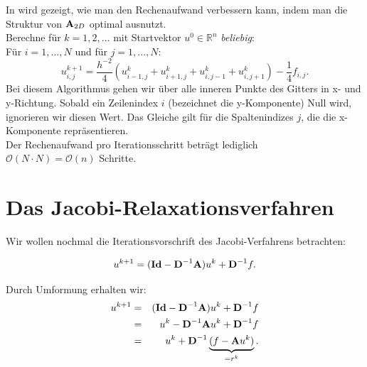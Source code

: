 In \cite[S. 21]{ALO02} wird gezeigt, wie man den Rechenaufwand verbessern kann, indem man die Struktur von ${\textbf{A}}_{2D}$ optimal ausnutzt.\\
Berechne für $k = 1,2,...$ mit Startvektor $u^{0} \in \mathbb{R}^{n}$ \textit{beliebig}:\\
Für $i = 1,...,N$ und für $j = 1,...,N$:
\begin{equation}
u^{k+1}_{i,j} = \frac{h^{-2}}{4} (u^{k}_{i-1,j} + u^{k}_{i+1,j} + u^{k}_{i,j-1} + u^{k}_{i,j+1}) - \frac{1}{4} f_{i,j}.
\end{equation}
Bei diesem Algorithmus gehen wir über alle inneren Punkte des Gitters in x- und y-Richtung. Sobald ein Zeilenindex $i$ (bezeichnet die y-Komponente) Null wird, ignorieren wir diesen Wert. Das Gleiche gilt für die Spaltenindizes $j$, die die x-Komponente repräsentieren.\\
Der Rechenaufwand pro Iterationsschritt beträgt lediglich \\$\mathcal{O}(N \cdot N)=\mathcal{O}(n)$ Schritte.

\section{Das Jacobi-Relaxationsverfahren}\label{s.Jacobi Relaxation}

Wir wollen nochmal die Iterationsvorschrift des Jacobi-Verfahrens betrachten:

\begin{equation}
u^{k+1} = ({\textbf{Id}} - {\textbf{D}}^{-1}{\textbf{A}})u^{k} + {\textbf{D}}^{-1}f.
\end{equation}

Durch Umformung erhalten wir:
\begin{eqnarray}
u^{k+1} &=& ({\textbf{Id}} - {\textbf{D}}^{-1}{\textbf{A}})u^{k} + {\textbf{D}}^{-1}f \notag \\
&=& u^{k} - {\textbf{D}}^{-1}{\textbf{A}}u^{k} + {\textbf{D}}^{-1}f \notag \\
&=& u^{k} + {\textbf{D}}^{-1} \underbrace{(f - {\textbf{A}}u^{k})}_{= r^{k}}.
\end{eqnarray}

